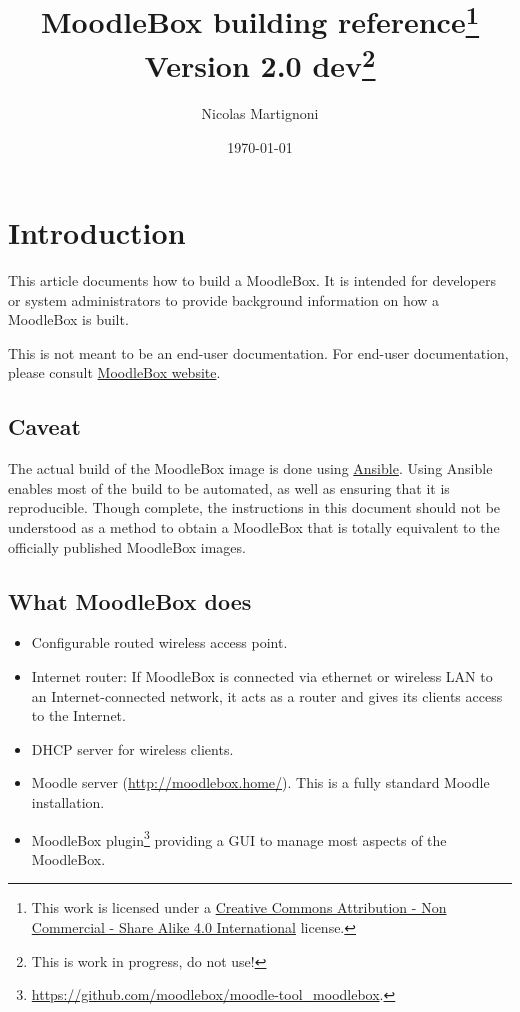 \documentclass[12pt]{article}
\begin{document}
\title{MoodleBox building reference\footnote{This work is licensed under a \href{http://creativecommons.org/licenses/by-nc-sa/4.0/}{Creative Commons Attribution - Non Commercial - Share Alike  4.0 International} license.}\\
Version 2.0 dev\footnote{This is work in progress, do not use!}}
\date{\today} %
\author{Nicolas Martignoni}
\maketitle

\begingroup
\setlength{\parskip}{0pt}
\tableofcontents
\endgroup
\clearpage

\section{Introduction}

This article documents how to build a MoodleBox.
It is intended for developers or system administrators to provide background information on how a MoodleBox is built.

This is not meant to be an end-user documentation.
For end-user documentation, please consult \href{https://moodlebox.net/}{MoodleBox website}.

\subsection{Caveat}

The actual build of the MoodleBox image is done using \href{https://www.ansible.com/}{Ansible}.
Using Ansible enables most of the build to be automated, as well as ensuring that it is reproducible.
Though complete, the instructions in this document should not be understood as a method to obtain a MoodleBox that is totally equivalent to the officially published MoodleBox images.

\subsection{What MoodleBox does}

\begin{itemize}
\item Configurable routed wireless access point.
\item Internet router: If MoodleBox is connected via ethernet or wireless LAN to an Internet-connected network, it acts as a router and gives its clients access to the Internet.
\item DHCP server for wireless clients.
\item Moodle server (\url{http://moodlebox.home/}).
This is a fully standard Moodle installation.
\item MoodleBox plugin\footnote{\url{https://github.com/moodlebox/moodle-tool_moodlebox}.} providing a GUI to manage most aspects of the MoodleBox.
\end{itemize}
\end{document}
